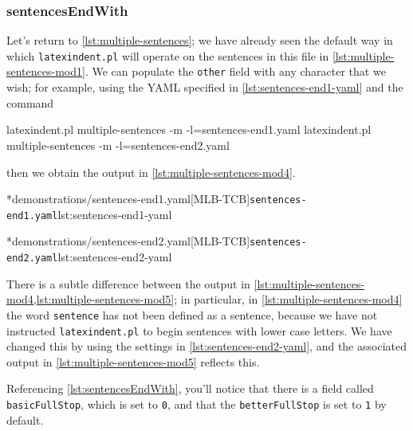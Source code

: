 \subsubsection{sentencesEndWith}
	Let's return to \vref{lst:multiple-sentences}; we have already seen the default way in
	which \texttt{latexindent.pl} will operate on the sentences in this file in
	\vref{lst:multiple-sentences-mod1}. We can populate the \texttt{other} field with
	any character that we wish; for example, using the YAML specified in
	\cref{lst:sentences-end1-yaml} and the command
	\begin{commandshell}
latexindent.pl multiple-sentences -m -l=sentences-end1.yaml
latexindent.pl multiple-sentences -m -l=sentences-end2.yaml
\end{commandshell}
	then we obtain the output in \cref{lst:multiple-sentences-mod4}.

        \begin{cmhtcbraster}
		\cmhlistingsfromfile[style=yaml-LST]*{demonstrations/sentences-end1.yaml}[MLB-TCB]{\texttt{sentences-end1.yaml}}{lst:sentences-end1-yaml}
        \end{cmhtcbraster}

        \begin{cmhtcbraster}
		\cmhlistingsfromfile[style=yaml-LST]*{demonstrations/sentences-end2.yaml}[MLB-TCB]{\texttt{sentences-end2.yaml}}{lst:sentences-end2-yaml}
        \end{cmhtcbraster}

	There is a subtle difference between the output in \cref{lst:multiple-sentences-mod4,lst:multiple-sentences-mod5}; in
	particular, in \cref{lst:multiple-sentences-mod4} the word \texttt{sentence} has not
	been defined as a sentence, because we have not instructed \texttt{latexindent.pl} to
	begin sentences with lower case letters. We have changed this by using the settings in
	\cref{lst:sentences-end2-yaml}, and the associated output in \cref{lst:multiple-sentences-mod5}
	reflects this.

	Referencing \vref{lst:sentencesEndWith}, you'll notice that there is a field called
	\texttt{basicFullStop}, which is set to \texttt{0}, and that the
	\texttt{betterFullStop} is set to \texttt{1} by default.


